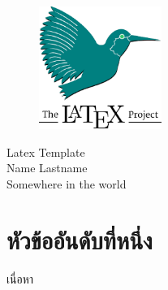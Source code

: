 \documentclass[16pt,a4paper]{article}
\begin{document}
\begin{titlepage}
  \begin{figure}
    \centering
    \includegraphics[width=4cm]{latex.png}
  \end{figure}
  \begin{center}
    \Huge Latex Template \\
    \vspace{5cm} 
    \LARGE Name Lastname \\
    \vfill
    \LARGE Somewhere in the world
    \pagebreak
  \end{center}
\end{titlepage}
\newpage
\section{หัวข้ออันดับที่หนึ่ง}
เนื่อหา
\end{document}
